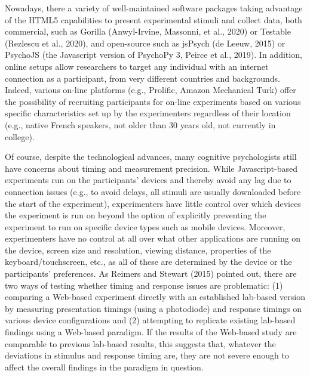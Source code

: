 \documentclass[
  english,
  man,floatsintext]{apa6}
\begin{document}
Nowadays, there a variety of well-maintained software packages taking advantage of the HTML5 capabilities to present experimental stimuli and collect data, both commercial, such as Gorilla (Anwyl-Irvine, Massonni, et al., 2020) or Testable (Rezlescu et al., 2020), and open-source such as jsPsych (de Leeuw, 2015) or PsychoJS (the Javascript version of PsychoPy 3, Peirce et al., 2019). In addition, online setups allow researchers to target any individual with an internet connection as a participant, from very different countries and backgrounds. Indeed, various on-line platforms (e.g., Prolific, Amazon Mechanical Turk) offer the possibility of recruiting participants for on-line experiments based on various specific characteristics set up by the experimenters regardless of their location (e.g., native French speakers, not older than 30 years old, not currently in college).

Of course, despite the technological advances, many cognitive psychologists still have concerns about timing and measurement precision. While Javascript-based experiments run on the participants' devices and thereby avoid any lag due to connection issues (e.g., to avoid delays, all stimuli are usually downloaded before the start of the experiment), experimenters have little control over which devices the experiment is run on beyond the option of explicitly preventing the experiment to run on specific device types such as mobile devices. Moreover, experimenters have no control at all over what other applications are running on the device, screen size and resolution, viewing distance, properties of the keyboard/touchscreen, etc., as all of these are determined by the device or the participants' preferences. As Reimers and Stewart (2015) pointed out, there are two ways of testing whether timing and response issues are problematic: (1) comparing a Web-based experiment directly with an established lab-based version by measuring presentation timings (using a photodiode) and response timings on various device configurations and (2) attempting to replicate existing lab-based findings using a Web-based paradigm. If the results of the Web-based study are comparable to previous lab-based results, this suggests that, whatever the deviations in stimulus and response timing are, they are not severe enough to affect the overall findings in the paradigm in question.
\end{document}
